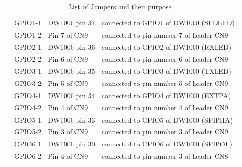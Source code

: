 \documentclass[journal,comsoc]{IEEEtran}
\begin{document}
\begin{table}[t!]
\begin{tabular}{|c|c|l|l|}
		\multicolumn{1}{|c}{} &
		\multicolumn{1}{|c|}{GPIO1-1} & 
		DW1000 pin 37 &
		connected to GPIO1 of DW1000 (SFDLED) \\ \cline{2-4}
		
		\multicolumn{1}{|c}{} &
		\multicolumn{1}{|c|}{GPIO1-2} & 
		Pin 7 of CN9 &
		connected to pin number 7 of header CN9 \\ \cline{2-4}
		
		\multicolumn{1}{|c}{} &
		\multicolumn{1}{|c|}{GPIO2-1} & 
		DW1000 pin 36 &
		connected to GPIO2 of DW1000 (RXLED) \\ \cline{2-4}
		
		\multicolumn{1}{|c}{} &
		\multicolumn{1}{|c|}{GPIO2-2} & 
		Pin 6 of CN9 &
		connected to pin number 6 of header CN9 \\ \cline{2-4}
		
		\multicolumn{1}{|c}{} &
		\multicolumn{1}{|c|}{GPIO3-1} & 
		DW1000 pin 35 &
		connected to GPIO3 of DW1000 (TXLED) \\ \cline{2-4}
		
		\multicolumn{1}{|c}{} &
		\multicolumn{1}{|c|}{GPIO3-2} & 
		Pin 5 of CN9 &
		connected to pin number 5 of header CN9 \\ \cline{2-4}
		
		\multicolumn{1}{|c}{} &
		\multicolumn{1}{|c|}{GPIO4-1} & 
		DW1000 pin 34 &
		connected to GPIO4 of DW1000 (EXTPA) \\ \cline{2-4}
		
		\multicolumn{1}{|c}{} &
		\multicolumn{1}{|c|}{GPIO4-2} & 
		Pin 4 of CN9 &
		connected to pin number 4 of header CN9 \\ \cline{2-4}
		
		\multicolumn{1}{|c}{} &
		\multicolumn{1}{|c|}{GPIO5-1} & 
		DW1000 pin 33 &
		connected to GPIO5 of DW1000 (SPIPHA) \\ \cline{2-4}
		
		\multicolumn{1}{|c}{} &
		\multicolumn{1}{|c|}{GPIO5-2} & 
		Pin 3 of CN9 &
		connected to pin number 3 of header CN9 \\ \cline{2-4}
		
		\multicolumn{1}{|c}{} &
		\multicolumn{1}{|c|}{GPIO6-1} & 
		DW1000 pin 30 &
		connected to GPIO6 of DW1000 (SPIPOL) \\ \cline{2-4}
		
		\multicolumn{1}{|c}{} &
		\multicolumn{1}{|c|}{GPIO6-2} & 
		Pin 4 of CN9 &
		connected to pin number 3 of header CN8 \\ \hline
		
	\end{tabular}
	\caption{List of Jumpers and their purpose.}
	\label{tab:jumpers}
\end{table}
\end{document}
